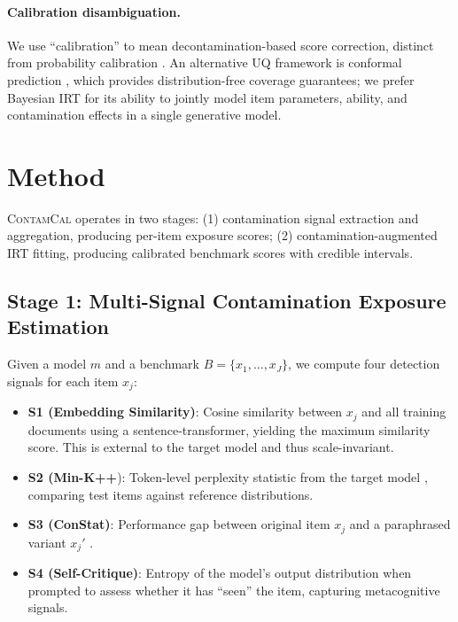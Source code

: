 \documentclass[11pt,a4paper]{article}
\newcommand{\method}{\textsc{ContamCal}}
\begin{document}
\paragraph{Calibration disambiguation.}
We use ``calibration'' to mean decontamination-based score correction, distinct from probability calibration \citep{guo2017,platt1999}. An alternative UQ framework is conformal prediction \citep{angelopoulos2023}, which provides distribution-free coverage guarantees; we prefer Bayesian IRT for its ability to jointly model item parameters, ability, and contamination effects in a single generative model.

\section{Method}
\label{sec:method}

\method{} operates in two stages: (1) contamination signal extraction and aggregation, producing per-item exposure scores; (2) contamination-augmented IRT fitting, producing calibrated benchmark scores with credible intervals.

\subsection{Stage 1: Multi-Signal Contamination Exposure Estimation}
\label{sec:stage1}

Given a model $m$ and a benchmark $B = \{x_1, \ldots, x_J\}$, we compute four detection signals for each item $x_j$:

\begin{itemize}
    \item \textbf{S1 (Embedding Similarity)}: Cosine similarity between $x_j$ and all training documents using a sentence-transformer, yielding the maximum similarity score. This is external to the target model and thus scale-invariant.
    \item \textbf{S2 (Min-K++}): Token-level perplexity statistic from the target model \citep{shi2024detecting}, comparing test items against reference distributions.
    \item \textbf{S3 (ConStat)}: Performance gap between original item $x_j$ and a paraphrased variant $x_j'$ \citep{oren2024proving}.
    \item \textbf{S4 (Self-Critique)}: Entropy of the model's output distribution when prompted to assess whether it has ``seen'' the item, capturing metacognitive signals.
\end{itemize}
\end{document}
